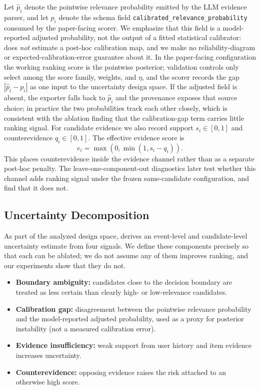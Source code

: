 Let $\hat{p}_i$ denote the pointwise relevance probability emitted by the LLM
evidence parser, and let $p_i$ denote the schema field
\texttt{calibrated\_relevance\_\allowbreak{}probability} consumed by the
paper-facing scorer. We emphasize that this field is a model-reported adjusted
probability, not the output of a fitted statistical calibrator: \method{} does
\emph{not} estimate a post-hoc calibration map, and we make no
reliability-diagram or expected-calibration-error guarantee about it. In the
paper-facing configuration the working ranking score is the pointwise
posterior; validation controls only select among the score family, weights, and
$\eta$, and the scorer records the gap $|\hat{p}_i-p_i|$ as one input to the
uncertainty design space. If the adjusted field is absent, the exporter falls
back to $\hat{p}_i$ and the provenance exposes that source choice; in practice
the two probabilities track each other closely, which is consistent with the
ablation finding that the calibration-gap term carries little ranking signal.
For candidate evidence we also record support $s_i\in[0,1]$ and counterevidence
$q_i\in[0,1]$. The effective evidence score is
\begin{equation}
    e_i = \max(0, \min(1, s_i-q_i)).
\end{equation}
This places counterevidence inside the evidence channel rather than as a
separate post-hoc penalty. The leave-one-component-out diagnostics later test
whether this channel adds ranking signal under the frozen same-candidate
configuration, and find that it does not.

\subsection{Uncertainty Decomposition}

As part of the analyzed design space, \method{} derives an event-level and
candidate-level uncertainty estimate from four signals. We define these
components precisely so that each can be ablated; we do not assume any of them
improves ranking, and our experiments show that they do not.

\begin{itemize}
    \item \textbf{Boundary ambiguity:} candidates close to the decision
    boundary are treated as less certain than clearly high- or low-relevance
    candidates.
    \item \textbf{Calibration gap:} disagreement between the pointwise
    relevance probability and the model-reported adjusted probability, used as a
    proxy for posterior instability (not a measured calibration error).
    \item \textbf{Evidence insufficiency:} weak support from user history and
    item evidence increases uncertainty.
    \item \textbf{Counterevidence:} opposing evidence raises the risk attached
    to an otherwise high score.
\end{itemize}

